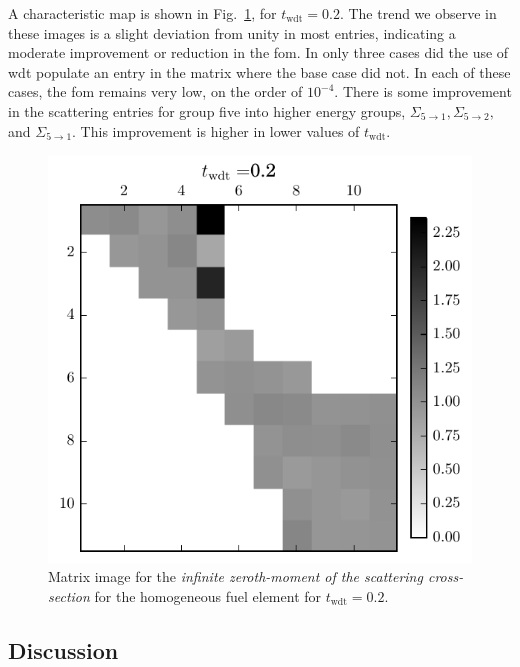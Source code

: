 A characteristic map is shown in Fig.~\ref{fig:homog_inf_sp0_map}, for
$t_{\mathrm{wdt}} = 0.2$. The trend we observe in these images is a
slight deviation from unity in most entries, indicating a moderate
improvement or reduction in the \gls{fom}. In only three cases did the
use of \gls{wdt} populate an entry in the matrix where the base case
did not. In each of these cases, the \gls{fom} remains very low, on
the order of $10^{-4}$. There is some improvement in the scattering
entries for group five into higher energy groups,
$\Sigma_{5 \to 1}, \Sigma_{5 \to 2},$ and $\Sigma_{5 \to 1}$. This
improvement is higher in lower values of $t_{\mathrm{wdt}}$.
\begin{figure}[hbtp]
  \centering
    \includegraphics[scale=0.75]{images/results/matshows/homog_sp0_matshow_1}
  \caption{Matrix image for the \textit{infinite zeroth-moment of the
      scattering cross-section} for the
    homogeneous fuel element for $t_{\mathrm{wdt}} = 0.2$.}
  \label{fig:homog_inf_sp0_map}
\end{figure}
\newpage
\subsection{Discussion}
\label{sec:homog_discussion}

